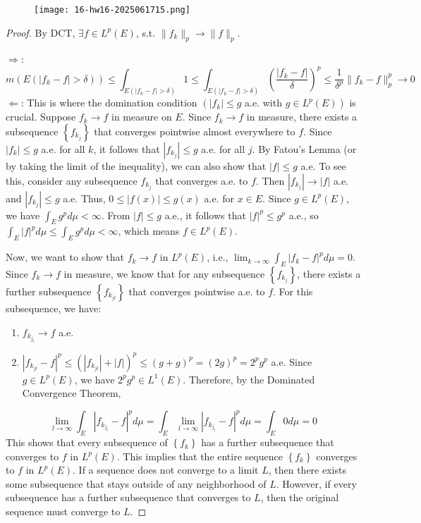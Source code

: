 \begin{exercise}
\begin{figure}[H]
\centering
\texttt{[image: 16-hw16-2025061715.png]}
\label{}
\end{figure}
\end{exercise}
\begin{proof}
By DCT, $\exists f\in L^{p}(E)$, s.t. $\lVert f_k \rVert_{p}\to \lVert f \rVert_{p}$.

$\Rightarrow$:
\[
m(E(\lvert f_k-f \rvert >\delta))\leq \int_{E(\lvert f_k-f \rvert >\delta)}^{} 1\leq \int_{E(\lvert f_k-f \rvert >\delta)}\left( \frac{\lvert f_k-f \rvert }{\delta} \right)^{p}\leq \frac{1}{\delta^{p}}\lVert f_k-f \rVert _{p}^{p}\to0
\]
$\Leftarrow$:
This is where the domination condition $\left(\left|f_k\right| \leq g\right.$ a.e. with $\left.g \in L^p(E)\right)$ is crucial.
Suppose $f_k \rightarrow f$ in measure on $E$.
Since $f_k \rightarrow f$ in measure, there exists a subsequence $\left\{f_{k_j}\right\}$ that converges pointwise almost everywhere to $f$.
Since $\left|f_k\right| \leq g$ a.e. for all $k$, it follows that $\left|f_{k_j}\right| \leq g$ a.e. for all $j$.
By Fatou's Lemma (or by taking the limit of the inequality), we can also show that $|f| \leq g$ a.e. To see this, consider any subsequence $f_{k_j}$ that converges a.e. to $f$. Then $\left|f_{k_j}\right| \rightarrow|f|$ a.e. and $\left|f_{k_j}\right| \leq g$ a.e. Thus, $0 \leq|f(x)| \leq g(x)$ a.e. for $x \in E$.
Since $g \in L^p(E)$, we have $\int_E g^p d \mu<\infty$. From $|f| \leq g$ a.e., it follows that $|f|^p \leq g^p$ a.e., so $\int_E|f|^p d \mu \leq \int_E g^p d \mu<\infty$, which means $f \in L^p(E)$.

Now, we want to show that $f_k \rightarrow f$ in $L^p(E)$, i.e., $\lim _{k \rightarrow \infty} \int_E\left|f_k-f\right|^p d \mu=0$.
Since $f_k \rightarrow f$ in measure, we know that for any subsequence $\left\{f_{k_j}\right\}$, there exists a further subsequence $\left\{f_{k_{j l}}\right\}$ that converges pointwise a.e. to $f$.
For this subsequence, we have:

\begin{enumerate}
	\item $f_{k_{j_l}} \rightarrow f$ a.e.
	\item $\left|f_{k_{j l}}-f\right|^p \leq\left(\left|f_{k_{j l}}\right|+|f|\right)^p \leq(g+g)^p=(2 g)^p=2^p g^p$ a.e. Since $g \in L^p(E)$, we have $2^p g^p \in L^1(E)$. Therefore, by the Dominated Convergence Theorem,
\end{enumerate}
\[
\lim _{l \rightarrow \infty} \int_E\left|f_{k_{j_l}}-f\right|^p d \mu=\int_E \lim _{l \rightarrow \infty}\left|f_{k_{j_l}}-f\right|^p d \mu=\int_E 0 d \mu=0
\]
This shows that every subsequence of $\left\{f_k\right\}$ has a further subsequence that converges to $f$ in $L^p(E)$. This implies that the entire sequence $\left\{f_k\right\}$ converges to $f$ in $L^p(E)$. If a sequence does not converge to a limit $L$, then there exists some subsequence that stays outside of any neighborhood of $L$. However, if every subsequence has a further subsequence that converges to $L$, then the original sequence must converge to $L$.
\end{proof}

